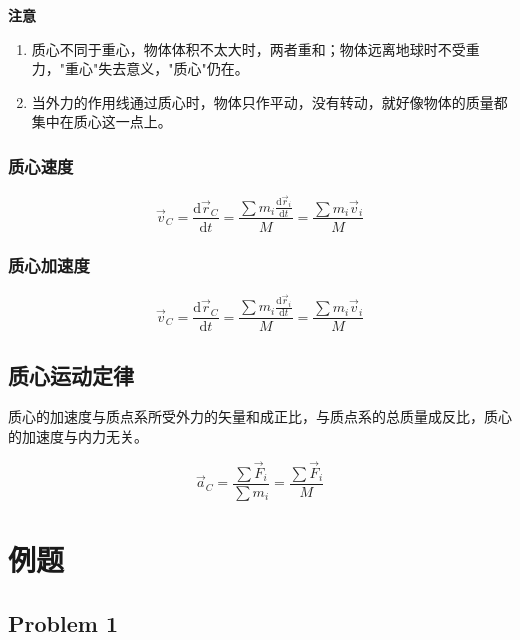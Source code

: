 \documentclass[
	12pt, %
	a4paper, %
]{myLegrandOrangeBook}
\newcommand{\rmd}{\mathrm{d}}
\begin{document}
\textbf{注意}

\begin{enumerate}
    \item 质心不同于重心，物体体积不太大时，两者重和；物体远离地球时不受重力，"重心"失去意义，"质心"仍在。
    \item 当外力的作用线通过质心时，物体只作平动，没有转动，就好像物体的质量都集中在质心这一点上。
\end{enumerate}

\subsubsection*{质心速度}

\begin{equation}
    \overrightarrow{v}_C=\frac{\rmd \overrightarrow{r}_C}{\rmd t}=\frac{\sum m_i \frac{\rmd \overrightarrow{r}_i}{\rmd t}}{M}=\frac{\sum m_i \overrightarrow{v}_i}{M}
\end{equation}

\subsubsection*{质心加速度}

\begin{equation}
    \overrightarrow{v}_C=\frac{\rmd \overrightarrow{r}_C}{\rmd t}=\frac{\sum m_i \frac{\rmd \overrightarrow{r}_i}{\rmd t}}{M}=\frac{\sum m_i \overrightarrow{v}_i}{M}
\end{equation}

\subsection{质心运动定律}

质心的加速度与质点系所受外力的矢量和成正比，与质点系的总质量成反比，质心的加速度与内力无关。

\begin{equation}
    \overrightarrow{a}_C=\frac{\sum \overrightarrow{F}_i}{\sum m_i}=\frac{\sum \overrightarrow{F}_i}{M}
\end{equation}


\section{例题}

\subsection{Problem 1}
\end{document}
